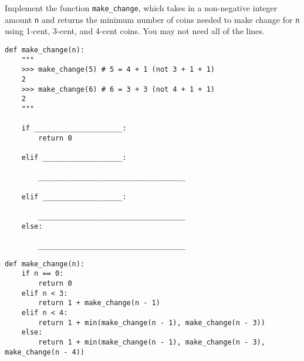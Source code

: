 \begin{blocksection}
\question 
Implement the function \lstinline{make_change}, which takes in a non-negative integer amount \lstinline{n} and returns the minimum number of coins needed to make change for \lstinline{n} using 1-cent, 3-cent, and 4-cent coins. You may not need all of the lines.

\begin{lstlisting}
def make_change(n):
    """
    >>> make_change(5) # 5 = 4 + 1 (not 3 + 1 + 1)
    2
    >>> make_change(6) # 6 = 3 + 3 (not 4 + 1 + 1)
    2
    """

    if _____________________:
        return 0

    elif ___________________:

        ___________________________________

    elif ___________________:

        ___________________________________
    else:

        ___________________________________
\end{lstlisting}
\end{blocksection}

\begin{blocksection}
\begin{solution}
\begin{lstlisting}
def make_change(n):
    if n == 0:
        return 0
    elif n < 3:
        return 1 + make_change(n - 1)
    elif n < 4:
        return 1 + min(make_change(n - 1), make_change(n - 3))
    else:
        return 1 + min(make_change(n - 1), make_change(n - 3), make_change(n - 4))
\end{lstlisting}
\end{solution}
\end{blocksection}
